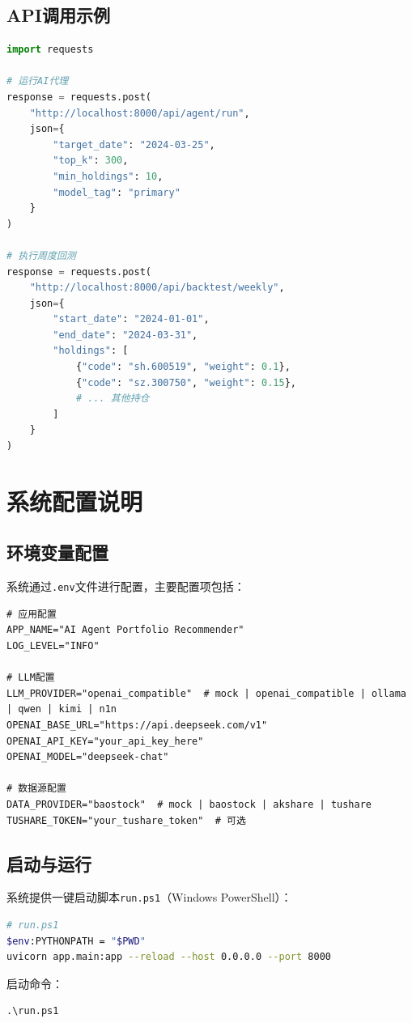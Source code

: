 \documentclass[12pt,a4paper]{ctexart}
\begin{document}
\subsection{API调用示例}

\begin{lstlisting}[language=Python, caption=API调用示例]
import requests

# 运行AI代理
response = requests.post(
    "http://localhost:8000/api/agent/run",
    json={
        "target_date": "2024-03-25",
        "top_k": 300,
        "min_holdings": 10,
        "model_tag": "primary"
    }
)

# 执行周度回测
response = requests.post(
    "http://localhost:8000/api/backtest/weekly",
    json={
        "start_date": "2024-01-01",
        "end_date": "2024-03-31",
        "holdings": [
            {"code": "sh.600519", "weight": 0.1},
            {"code": "sz.300750", "weight": 0.15},
            # ... 其他持仓
        ]
    }
)
\end{lstlisting}

\section{系统配置说明}

\subsection{环境变量配置}

系统通过\texttt{.env}文件进行配置，主要配置项包括：

\begin{lstlisting}[caption=环境变量配置示例]
# 应用配置
APP_NAME="AI Agent Portfolio Recommender"
LOG_LEVEL="INFO"

# LLM配置
LLM_PROVIDER="openai_compatible"  # mock | openai_compatible | ollama | qwen | kimi | n1n
OPENAI_BASE_URL="https://api.deepseek.com/v1"
OPENAI_API_KEY="your_api_key_here"
OPENAI_MODEL="deepseek-chat"

# 数据源配置
DATA_PROVIDER="baostock"  # mock | baostock | akshare | tushare
TUSHARE_TOKEN="your_tushare_token"  # 可选
\end{lstlisting}

\subsection{启动与运行}

系统提供一键启动脚本\texttt{run.ps1}（Windows PowerShell）：

\begin{lstlisting}[language=bash, caption=系统启动脚本]
# run.ps1
$env:PYTHONPATH = "$PWD"
uvicorn app.main:app --reload --host 0.0.0.0 --port 8000
\end{lstlisting}

启动命令：
\begin{verbatim}
.\run.ps1
\end{verbatim}
\end{document}
